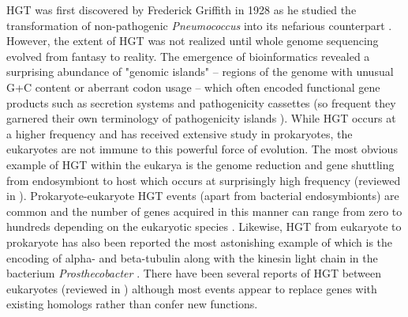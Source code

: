 HGT was first discovered by Frederick Griffith in 1928 as he studied the
transformation of non-pathogenic \textit{Pneumococcus} into its nefarious
counterpart \cite{Griffith:1928vg}. However, the extent of HGT was not realized
until whole genome sequencing evolved from fantasy to reality. The emergence of
bioinformatics revealed a surprising abundance of "genomic islands" -- regions
of the genome with unusual G+C content or aberrant codon usage -- which  often
encoded functional gene products such as secretion systems and pathogenicity
cassettes (so frequent they garnered their own terminology of pathogenicity
islands \cite{Hacker:1990}). While HGT occurs at a higher frequency and has
received extensive study in prokaryotes, the eukaryotes are
not immune to this powerful force of evolution. The most obvious example of HGT
within the eukarya is the genome reduction and gene shuttling from endosymbiont
to host which occurs at surprisingly high frequency (reviewed in
\citet{Timmis:2004ks}).  Prokaryote-eukaryote HGT events (apart from bacterial
endosymbionts) are common and the number of genes acquired in this manner can
range from zero to hundreds depending on the eukaryotic species
\cite{Keeling:2008ch}. Likewise, HGT from eukaryote to prokaryote has also been
reported \cite{Doolittle:1990uo} the most astonishing example of which is the
encoding of alpha- and beta-tubulin along with the kinesin light chain in the
bacterium \textit{Prosthecobacter} \cite{Jenkins:2002ty}. There have been
several reports of HGT between eukaryotes (reviewed in \citet{Keeling:2008ch})
although most events appear to  replace genes with existing homologs rather than
confer new functions. 


